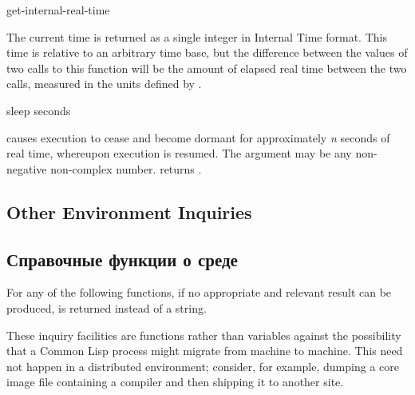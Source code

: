 \begin{defun}[Function]
get-internal-real-time 

The current time is returned as a single integer in Internal Time
format.  This time is relative to an arbitrary time base,
but the difference between the values of two calls
to this function will be the amount of elapsed real time between the two calls,
measured in the units defined by .

\end{defun}

\begin{defun}[Function]
sleep seconds

 causes execution to cease and become dormant for
approximately \emph{n} seconds of real time, whereupon execution is resumed.
The argument may be any non-negative non-complex number.
 returns {\nil}.

\end{defun}

\subsection{Other Environment Inquiries}

\subsection{Справочные функции о среде}

For any of the following functions, if no appropriate
and relevant result can be produced, {\nil} is returned instead
of a string.


\beforenoterule
\begin{rationale}
These inquiry facilities are functions rather than variables
against the possibility that a Common Lisp process might migrate from
machine to machine.  This need not happen in a distributed
environment; consider, for example, dumping a core image file
containing a compiler and then shipping it to another site.
\end{rationale}
\afternoterule

